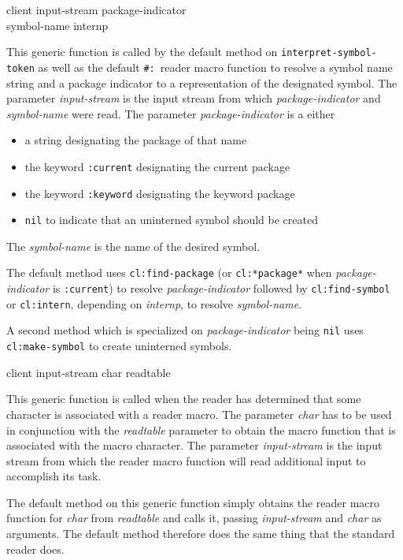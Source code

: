  {client input-stream package-indicator \\
  symbol-name internp}

This generic function is called by the default method on
\texttt{interpret-symbol-token} as well as the default
\texttt{\#:}~reader macro function to resolve a symbol name string and
a package indicator to a representation of the designated symbol.  The
parameter \textit{input-stream} is the input stream from which
\textit{package-indicator} and \textit{symbol-name} were read.  The
parameter \textit{package-indicator} is a either

\begin{itemize}
\item a string designating the package of that name
\item the keyword \texttt{:current} designating the current package
\item the keyword \texttt{:keyword} designating the keyword package
\item \texttt{nil} to indicate that an uninterned symbol should be
  created
\end{itemize}

The \textit{symbol-name} is the name of the desired symbol.

The default method uses \texttt{cl:find-package} (or
\texttt{cl:*package*} when \textit{package-indicator} is
\texttt{:current}) to resolve \textit{package-indicator} followed by
\texttt{cl:find-symbol} or \texttt{cl:intern}, depending on
\textit{internp}, to resolve \textit{symbol-name}.

A second method which is specialized on \textit{package-indicator}
being \texttt{nil} uses \texttt{cl:make-symbol} to create uninterned
symbols.

 {client input-stream char readtable}

This generic function is called when the reader has determined that
some character is associated with a reader macro.  The parameter
\textit{char} has to be used in conjunction with the
\textit{readtable} parameter to obtain the macro function that is
associated with the macro character.  The parameter
\textit{input-stream} is the input stream from which the reader macro
function will read additional input to accomplish its task.

The default method on this generic function simply obtains the reader
macro function for \textit{char} from \textit{readtable} and calls it,
passing \textit{input-stream} and \textit{char} as arguments.  The
default method therefore does the same thing that the standard
\commonlisp{} reader does.

